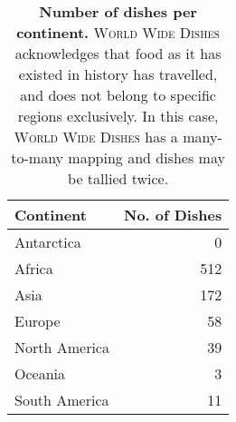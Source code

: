 \begin{table}[h]
\centering
\caption{\small \textbf{Number of dishes per continent.} \textsc{World Wide Dishes} acknowledges that food as it has existed in history has travelled, and does not belong to specific regions exclusively. In this case, \textsc{World Wide Dishes} has a many-to-many mapping and dishes may be tallied twice.}
\label{tab:continent_tally}
\begin{tabular}{lr} 
\\
\toprule
\textbf{Continent}& \textbf{No. of Dishes}   \\ 
\midrule
Antarctica  & 0    \\
Africa  &  512     \\
Asia & 172    \\
Europe  & 58 \\
North America  &  39  \\
Oceania  &  3 \\
South America  &  11  \\

\bottomrule
\end{tabular}
\end{table}